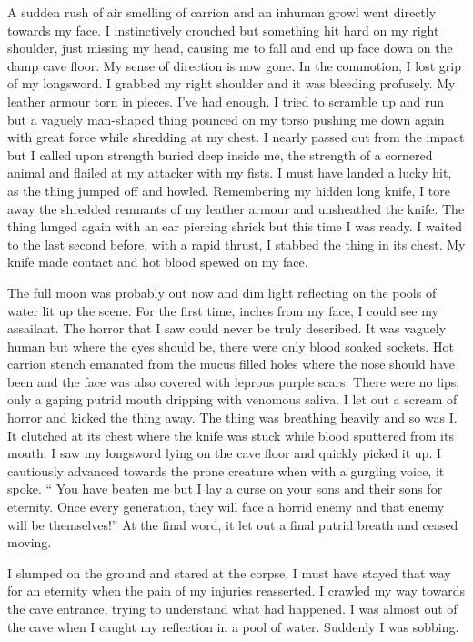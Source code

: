 A sudden rush of air smelling of carrion and an inhuman growl went
directly towards my face. I instinctively crouched but something
hit hard on my right shoulder, just missing my head, causing me to
fall and end up face down on the damp cave floor. My sense of
direction is now gone. In the commotion, I lost grip of my
longsword. I grabbed my right shoulder and it was bleeding
profusely. My leather armour torn in pieces. I've had enough.
I tried to scramble up and run but a vaguely man-shaped thing
pounced on my torso pushing me down again with great force while
shredding at my chest. I nearly passed out from the impact but I
called upon strength buried deep inside me, the strength of a
cornered animal and flailed at my attacker with my fists. I must
have landed a lucky hit, as the thing jumped off and howled.
Remembering my hidden long knife, I tore away the shredded remnants
of my leather armour and unsheathed the knife. The thing lunged
again with an ear piercing shriek but this time I was ready. I
waited to the last second before, with a rapid thrust, I stabbed
the thing in its chest. My knife made contact and hot blood spewed
on my face.





The full moon was probably out now and dim light reflecting on the
pools of water lit up the scene. For the first time, inches from my
face, I could see my assailant. The horror that I saw could never
be truly described. It was vaguely human but where the eyes should
be, there were only blood soaked sockets. Hot carrion stench
emanated from the mucus filled holes where the nose should have
been and the face was also covered with leprous purple scars. There
were no lips, only a gaping putrid mouth dripping with venomous
saliva. I let out a scream of horror and kicked the thing away. The
thing was breathing heavily and so was I. It clutched at its chest
where the knife was stuck while blood sputtered from its mouth. I
saw my longsword lying on the cave floor and quickly picked it up.
I cautiously advanced towards the prone creature when with a
gurgling voice, it spoke. `` You have beaten me but I lay a
curse on your sons and their sons for eternity. Once every
generation, they will face a horrid enemy and that enemy will be
themselves!'' At the final word, it let out a final putrid
breath and ceased moving.



I slumped on the ground and stared at the corpse. I must have
stayed that way for an eternity when the pain of my injuries
reasserted. I crawled my way towards the cave entrance, trying to
understand what had happened. I was almost out of the cave when I
caught my reflection in a pool of water. Suddenly I was sobbing. 

 



